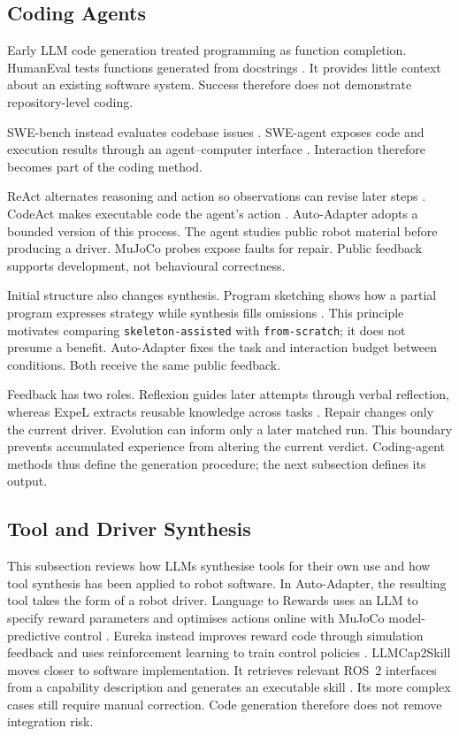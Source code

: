 \subsection{Coding Agents}
\label{sec:coding-agents}

Early LLM code generation treated programming as function completion. HumanEval
tests functions generated from docstrings \citep{chen2021codex}. It provides
little context about an existing software system. Success therefore does not
demonstrate repository-level coding.

SWE-bench instead evaluates codebase issues \citep{jimenez2024swebench}.
SWE-agent exposes code and execution results through an agent--computer
interface \citep{yang2024sweagent}. Interaction therefore becomes part of the
coding method.

ReAct alternates reasoning and action so observations can revise later steps
\citep{yao2023react}. CodeAct makes executable code the agent's action
\citep{wang2024codeact}. Auto-Adapter adopts a bounded version of this process.
The agent studies public robot material before producing a driver. MuJoCo probes
expose faults for repair. Public feedback supports development, not behavioural
correctness.

Initial structure also changes synthesis. Program sketching shows how a partial
program expresses strategy while synthesis fills omissions
\citep{solarlezama2013sketching}. This principle motivates comparing
\texttt{skeleton-assisted} with \texttt{from-scratch}; it does not presume a
benefit. Auto-Adapter fixes the task and interaction budget between conditions.
Both receive the same public feedback.

Feedback has two roles. Reflexion guides later attempts through verbal
reflection, whereas ExpeL extracts reusable knowledge across tasks
\citep{shinn2023reflexion,zhao2024expel}. Repair changes only the current driver.
Evolution can inform only a later matched run. This boundary prevents
accumulated experience from altering the current verdict. Coding-agent methods
thus define the generation procedure; the next subsection defines its output.

\subsection{Tool and Driver Synthesis}
\label{sec:tool-driver-synthesis}

This subsection reviews how LLMs synthesise tools for their own use and how
tool synthesis has been applied to robot software. In Auto-Adapter, the
resulting tool takes the form of a robot driver. Language to Rewards uses an
LLM to specify reward parameters and optimises actions online with MuJoCo
model-predictive control \citep{yu2023language2reward}. Eureka instead improves
reward code through simulation feedback and uses reinforcement learning to
train control policies \citep{ma2024eureka}. LLMCap2Skill moves
closer to software implementation. It retrieves relevant ROS~2 interfaces from
a capability description and generates an executable skill
\citep{vieira2025cap2skill}. Its more complex cases still require manual
correction. Code generation therefore does not remove integration risk.

